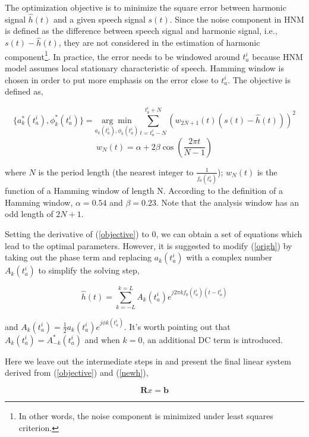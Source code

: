\documentclass[dvips]{article}
\newcommand{\matr}[1]{\mathbf{#1}}
\begin{document}
The optimization objective is to minimize the square error between harmonic signal $\hat{h}(t)$ and a given speech signal $s(t)$. Since the noise component in HNM is defined as the difference between speech signal and harmonic signal, i.e., $s(t) - \hat{h}(t)$, they are not considered in the estimation of harmonic component\footnote{In other words, the noise component is minimized under least squares criterion.}. In practice, the error needs to be windowed around $t^i_a$ because HNM model assumes local stationary characteristic of speech. Hamming window is chosen in order to put more emphasis on the error close to $t^i_a$. The objective is defined as,

\begin{equation} \label{objective}
\{a_k^*(t^i_a), \phi_k^*(t^i_a)\} = \underset{a_k(t^i_a), \phi_k(t^i_a)}{\arg\min} \sum_{t = t^i_a - N}^{t^i_a + N} \left(w_{2N + 1}(t)(s(t) - \hat{h}(t))\right)^2
\end{equation}
\begin{equation} \label{symhamm0}
w_N(t) = \alpha + 2\beta\cos(\frac{2\pi t}{N - 1})
\end{equation}

where $N$ is the period length (the nearest integer to $\frac{1}{f_0(t^i_a)}$); $w_N(t)$ is the function of a Hamming window of length N. According to the definition of a Hamming window, $\alpha = 0.54$ and $\beta = 0.23$. Note that the analysis window has an odd length of $2N + 1$.

Setting the derivative of (\ref{objective}) to 0, we can obtain a set of equations which lead to the optimal parameters. However, it is suggested to modify (\ref{origh}) by taking out the phase term and replacing $a_k(t^i_a)$ with a complex number $A_k(t^i_a)$ to simplify the solving step,

\begin{equation} \label{newh}
\hat{h}(t) = \sum_{k = -L}^{k = L} A_k(t^i_a) e^{j 2\pi k f_0(t^i_a)(t - t^i_a)}
\end{equation}

and $A_k(t^i_a) = \frac{1}{2} a_k(t^i_a) e^{j \phi k(t^i_a)}$. It's worth pointing out that $A_k(t^i_a) = A^*_{-k}(t^i_a)$ and when $k = 0$, an additional DC term is introduced.

Here we leave out the intermediate steps in \cite{stylianou-1996} and present the final linear system derived from (\ref{objective}) and (\ref{newh}),

\begin{equation} \label{linsys}
\matr{R}x = \matr{b}
\end{equation}
\end{document}
